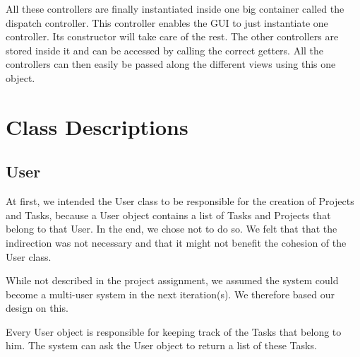         All these controllers are finally instantiated inside one big container called the dispatch controller. This controller enables the GUI to just instantiate one controller. Its constructor will take care of the rest. The other controllers are stored inside it and can be accessed by calling the correct getters. All the controllers can then easily be passed along the different views using this one object.

	\section{Class Descriptions}
		
			\subsection{User}
			At first, we intended the User class to be responsible for the creation of Projects and Tasks, because a User object contains a list of Tasks and Projects that belong to that User. In the end, we chose not to do so. We felt that that the indirection was not necessary and that it might not benefit the cohesion of the User class.

			While not described in the project assignment, we assumed the system could become a multi-user system in the next iteration(s). We therefore based our design on this.

			Every User object is responsible for keeping track of the Tasks that belong to him. The system can ask the User object to return a list of these Tasks.

